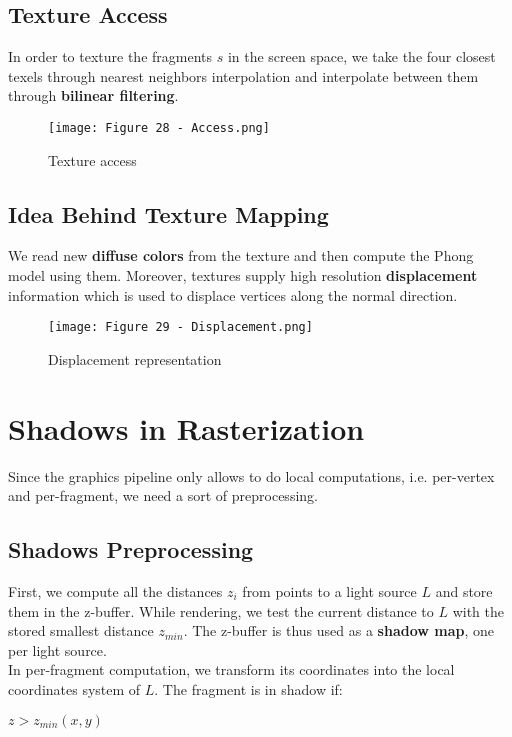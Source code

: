 \documentclass{article}
\begin{document}
\subsection{Texture Access}
In order to texture the fragments $s$ in the screen space, we take the four closest texels through nearest neighbors interpolation and interpolate between them through \textbf{bilinear filtering}.
\begin{figure}[H]
    \centering
    \texttt{[image: Figure 28 - Access.png]}
    \caption{Texture access}
\end{figure}
\subsection{Idea Behind Texture Mapping}
We read new \textbf{diffuse colors} from the texture and then compute the Phong model using them. Moreover, textures supply high resolution \textbf{displacement} information which is used to displace vertices along the normal direction.
\begin{figure}[H]
    \centering
    \texttt{[image: Figure 29 - Displacement.png]}
    \caption{Displacement representation}
\end{figure}

\newpage

\section{Shadows in Rasterization}
Since the graphics pipeline only allows to do local computations, i.e. per-vertex and per-fragment, we need a sort of preprocessing.
\subsection{Shadows Preprocessing}
First, we compute all the distances $z_i$ from points to a light source $L$ and store them in the z-buffer. While rendering, we test the current distance to $L$ with the stored smallest distance $z_{min}$. The z-buffer is thus used as a \textbf{shadow map}, one per light source. \\
In per-fragment computation, we transform its coordinates into the local coordinates system of $L$. The fragment is in shadow if:
\begin{center}
    $z > z_{min}(x,y)$
\end{center}
\end{document}
